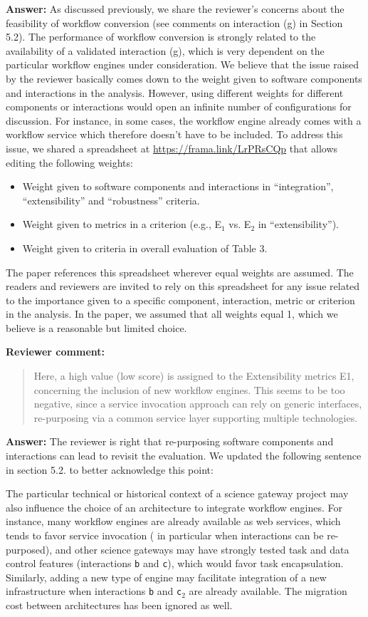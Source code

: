 \documentclass[a4]{article}
\newenvironment{review}%
{\textbf{Reviewer comment:}\begin{quote}}%
{\end{quote}}%
\newcommand{\answer}[1]{\textbf{Answer:} #1}
\newcommand{\revised}[1]{\color{blue} #1\color{black}}
\begin{document}
\answer{As discussed previously, we share the reviewer's concerns
  about the feasibility of workflow conversion (see comments on
  interaction (g) in Section 5.2). The performance of workflow
  conversion is strongly related to the availability of a validated
  interaction (g), which is very dependent on the particular workflow
  engines under consideration. We believe that the issue raised by the
  reviewer basically comes down to the weight given to software
  components and interactions in the analysis. However, using
  different weights for different components or interactions would
  open an infinite number of configurations for discussion. For
  instance, in some cases, the workflow engine already comes with a
  workflow service which therefore doesn't have to be included. To
  address this issue, we shared a spreadsheet at
  \url{https://frama.link/LrPRsCQp} that allows editing the following
  weights:
  \begin{itemize}
  \item Weight given to software components and interactions in
  ``integration'', ``extensibility'' and ``robustness'' criteria.
  \item Weight given to metrics in a criterion (e.g., E$_1$ vs. E$_2$ in
  ``extensibility'').
  \item Weight given to criteria in overall evaluation of Table 3.
\end{itemize}
The paper references this spreadsheet wherever equal weights are
assumed. The readers and reviewers are invited to rely on this
spreadsheet for any issue related to the importance given to a
specific component, interaction, metric or criterion in the
analysis. In the paper, we assumed that all weights equal 1, which we
believe is a reasonable but limited choice.
}

\begin{review}
  Here, a high value (low score) is assigned to the Extensibility
  metrics E1, concerning the inclusion of new workflow engines. This
  seems to be too negative, since a service invocation approach can
  rely on generic interfaces, re-purposing via a common service layer
  supporting multiple technologies.
\end{review}

\answer{The reviewer is right that re-purposing software components
  and interactions can lead to revisit the evaluation. We updated the following sentence in section 5.2. to better acknowledge this point:}

The particular technical or historical context of a science gateway
project may also influence the choice of an architecture to
integrate workflow engines. For instance, many workflow engines are
already available as web services, which tends to favor service
invocation (\revised{in particular when interactions can be re-purposed}), and other science gateways may have strongly tested task
and data control features (interactions \texttt{b} and \texttt{c}),
which would favor task encapsulation. Similarly, adding a new type of engine
may facilitate integration of a new infrastructure when interactions
\texttt{b} and \texttt{c$_2$} are already available. The migration
cost between architectures has been ignored as well.
\end{document}
